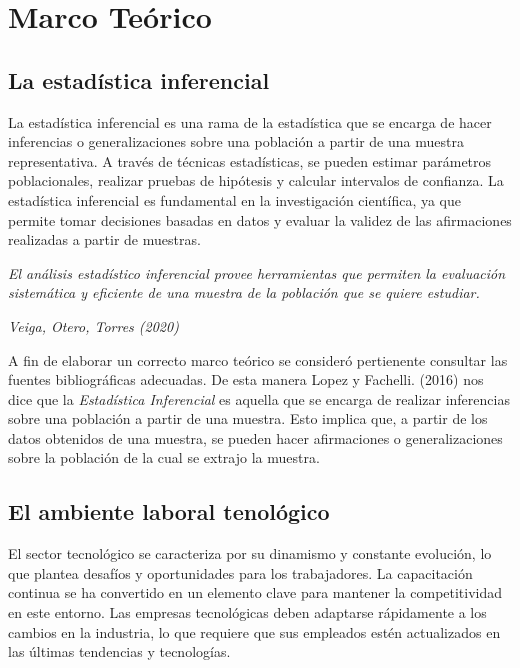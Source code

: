 \section{Marco Teórico}

  \subsection{La estadística inferencial}

  La estadística inferencial es una rama de la estadística que se encarga de hacer inferencias o generalizaciones sobre una población a partir de una muestra representativa. A través de técnicas estadísticas, se pueden estimar parámetros poblacionales, realizar pruebas de hipótesis y calcular intervalos de confianza. La estadística inferencial es fundamental en la investigación científica, ya que permite tomar decisiones basadas en datos y evaluar la validez de las afirmaciones realizadas a partir de muestras.

  \begin{flushright}
    \textit{El análisis estadístico inferencial provee herramientas que 
    permiten la evaluación sistemática y eficiente de una muestra de la población que se quiere estudiar.}
    \cite{Veiga}
  \end{flushright}
  \begin{flushright}
    \textit{Veiga, Otero, Torres (2020)}
  \end{flushright}

  A fin de elaborar un correcto marco teórico se consideró pertienente consultar las fuentes bibliográficas adecuadas. De esta manera Lopez y Fachelli. (2016) nos dice que la \textit{Estadística Inferencial} es aquella que se encarga de realizar inferencias sobre una población a partir de una muestra. Esto implica que, a partir de los datos obtenidos de una muestra, se pueden hacer afirmaciones o generalizaciones sobre la población de la cual se extrajo la muestra.

  \subsection{El ambiente laboral tenológico}

  El sector tecnológico se caracteriza por su dinamismo y constante evolución, lo que plantea desafíos y oportunidades para los trabajadores. La capacitación continua se ha convertido en un elemento clave para mantener la competitividad en este entorno. Las empresas tecnológicas deben adaptarse rápidamente a los cambios en la industria, lo que requiere que sus empleados estén actualizados en las últimas tendencias y tecnologías.

